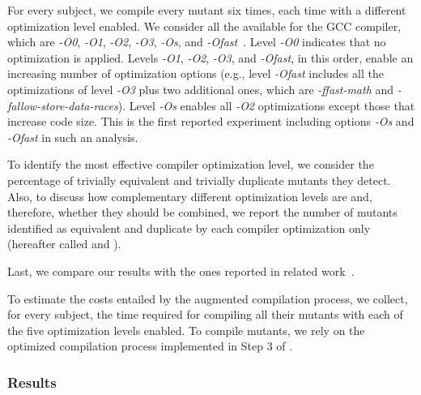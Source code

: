For every subject, we compile every mutant six times, each time with a different optimization level enabled. We consider all the available  for the GCC compiler, which are \emph{-O0}, \emph{-O1}, \emph{-O2}, \emph{-O3}, \emph{-Os},
and \emph{-Ofast}~\cite{GCCopt}. Level \emph{-O0} indicates that no optimization is applied. Levels \emph{-O1}, \emph{-O2}, \emph{-O3}, and \emph{-Ofast}, in this order, enable an increasing number of optimization options (e.g., level \emph{-Ofast} includes all the optimizations of level \emph{-O3} plus two additional ones, which are \emph{-ffast-math} and \emph{-fallow-store-data-races}). Level \emph{-Os} enables all \emph{-O2} optimizations except those that increase code size. This is the first reported experiment including options \emph{-Os} and \emph{-Ofast} in such an analysis.


To identify the most effective compiler optimization level, we consider the percentage of trivially equivalent and trivially duplicate mutants they detect. Also, to discuss how complementary different optimization levels  are and, therefore, whether they should be combined, we report the number of mutants identified as equivalent and duplicate by each compiler optimization only (hereafter called  and ).

Last, we compare our results with the ones reported in related work~\cite{papadakis2015trivial}.

To estimate the costs entailed by the augmented compilation process, we collect, for every subject, the time required for compiling all their mutants with each of the five optimization levels enabled. To compile mutants, we rely on the optimized compilation process implemented in Step 3 of \APPR.



\subsubsection{Results}

